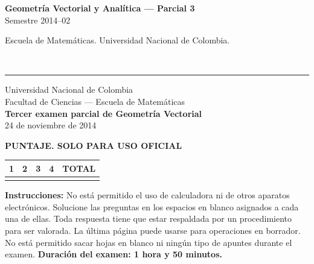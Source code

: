 \documentclass[11pt]{article}
\newcommand{\examheader}{%
  \noindent
  \begin{minipage}[t]{0.6\linewidth}
    {\small\bfseries Geometría Vectorial y Analítica --- Parcial 3}\\
    {\small Semestre 2014--02}
  \end{minipage}%
  \hfill
  \begin{minipage}[t]{0.35\linewidth}
    \raggedleft\small Escuela de Matemáticas. Universidad Nacional de Colombia.
  \end{minipage}\\[2pt]
  \rule{\linewidth}{0.6pt}
}
\begin{document}
\examheader

\begin{center}
Universidad Nacional de Colombia\\
Facultad de Ciencias --- Escuela de Matemáticas\\
\textbf{Tercer examen parcial de Geometría Vectorial}\\
24 de noviembre de 2014
\end{center}

\vspace{10pt}
\textbf{PUNTAJE. SOLO PARA USO OFICIAL}

\begin{center}
\begin{tabular}{|c|c|c|c|c|}
\hline
1 & 2 & 3 & 4 & TOTAL \\
\hline
 & & & & \\
\hline
\end{tabular}
\end{center}

\vspace{10pt}
\textbf{Instrucciones:} No está permitido el uso de calculadora ni de otros aparatos electrónicos. Solucione las preguntas en los espacios en blanco asignados a cada una de ellas. Toda respuesta tiene que estar respaldada por un procedimiento para ser valorada. La última página puede usarse para operaciones en borrador. No está permitido sacar hojas en blanco ni ningún tipo de apuntes durante el examen. \textbf{Duración del examen: 1 hora y 50 minutos.}
\end{document}
